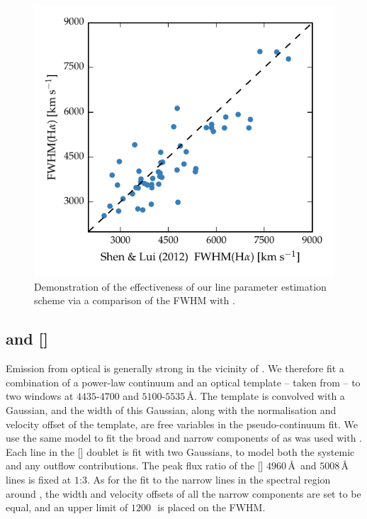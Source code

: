 \begin{figure}
    \centering 
    \includegraphics[width=0.8\linewidth]{figures/chapter03/shen_comparison_ha.pdf} 
    \caption[{Demonstration of the effectiveness of our \ha line parameter estimation scheme.}]{Demonstration of the effectiveness of our line parameter estimation scheme via a comparison of the \ha FWHM with \citet{shen12}.} 
    \label{fig:shen_comparison_ha}
\end{figure}

\subsection{\hb and []}
\label{sec:hb}

Emission from optical  is generally strong in the vicinity of \hbns.
We therefore fit a combination of a power-law continuum and an optical  template -- taken from \citet{boroson92} -- to two windows at $4435$-$4700$ and $5100$-$5535$\,\AA. 
The  template is convolved with a Gaussian, and the width of this Gaussian, along with the normalisation and velocity offset of the  template, are free variables in the pseudo-continuum fit.
We use the same model to fit the broad and narrow components of \hb as was used with \hans. 
Each line in the [] doublet is fit with two Gaussians, to model both the systemic and any outflow contributions. 
The peak flux ratio of the [] $4960$\,\AA\, and $5008$\,\AA\, lines is fixed at $1$:$3$. 
As for the fit to the narrow lines in the spectral region around \hans, the width and velocity offsets of all the narrow components are set to be equal, and an upper limit of $1200$\,\kms\, is placed on the FWHM. 

